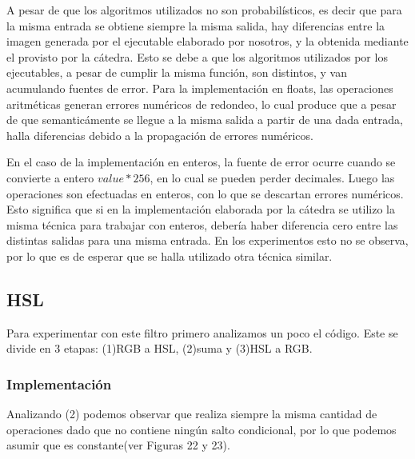 \documentclass[a4paper]{article}
\begin{document}
A pesar de que los algoritmos utilizados no son probabilísticos, es decir que para la misma entrada se obtiene siempre la misma salida, hay diferencias entre la imagen generada por el ejecutable elaborado por nosotros, y la obtenida mediante el provisto por la cátedra. Esto se debe a que los algoritmos utilizados por los ejecutables, a pesar de cumplir la misma función, son distintos, y van acumulando fuentes de error. Para la implementación en floats, las operaciones aritméticas generan errores numéricos de redondeo, lo cual produce que a pesar de que semanticámente se llegue a la misma salida a partir de una dada entrada, halla diferencias debido a la propagación de errores numéricos.

En el caso de la implementación en enteros, la fuente de error ocurre cuando se convierte a entero  $value*256$, en lo cual se pueden perder decimales. Luego las operaciones son efectuadas en enteros, con lo que se descartan errores numéricos. Esto significa que si en la implementación elaborada por la cátedra se utilizo la misma técnica para trabajar con enteros, debería haber diferencia cero entre las distintas salidas para una misma entrada. En los experimentos esto no se observa, por lo que es de esperar que se halla utilizado otra técnica similar.


\subsection{HSL}
Para experimentar con este filtro primero analizamos un poco el código. Este se divide en 3 etapas: (1)RGB a HSL, (2)suma y (3)HSL a RGB.

\subsubsection{Implementación}
 Analizando (2) podemos observar que realiza siempre la misma cantidad de operaciones dado que no contiene ningún salto condicional, por lo que podemos asumir que es constante(ver Figuras 22 y 23).
\end{document}
